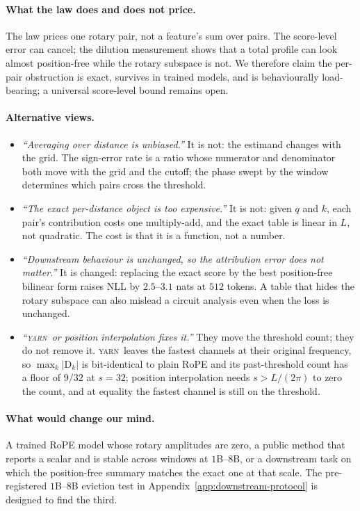 \documentclass{article}
\theoremstyle{plain}
\theoremstyle{remark}
\newcommand{\yarn}{\textsc{yarn}}
\newcommand{\D}{\mathrm{D}_k}
\begin{document}
\paragraph{What the law does and does not price.} The law prices one rotary
pair, not a feature's sum over pairs. The score-level error can cancel; the
dilution measurement shows that a total profile can look almost position-free
while the rotary subspace is not. We therefore claim the per-pair obstruction is
exact, survives in trained models, and is behaviourally load-bearing; a
universal score-level bound remains open.

\paragraph{Alternative views.}
\begin{itemize}
\item \emph{``Averaging over distance is unbiased.''} It is not: the estimand
changes with the grid. The sign-error rate is a ratio whose numerator and
denominator both move with the grid and the cutoff; the phase swept by the
window determines which pairs cross the threshold.
\item \emph{``The exact per-distance object is too expensive.''} It is not:
given $q$ and $k$, each pair's contribution costs one multiply-add, and the
exact table is linear in $L$, not quadratic. The cost is that it is a function,
not a number.
\item \emph{``Downstream behaviour is unchanged, so the attribution error does
not matter.''} It is changed: replacing the exact score by the best
position-free bilinear form raises NLL by $2.5$--$3.1$ nats at $512$ tokens.
A table that hides the rotary subspace can also mislead a circuit analysis even
when the loss is unchanged.
\item \emph{``\yarn\ or position interpolation fixes it.''} They move the
threshold count; they do not remove it. \yarn\ leaves the fastest channels at
their original frequency, so $\max_k|\D|$ is bit-identical to plain RoPE and
its past-threshold count has a floor of $9/32$ at $s=32$; position
interpolation needs $s>L/(2\pi)$ to zero the count, and at equality the fastest
channel is still on the threshold.
\end{itemize}

\paragraph{What would change our mind.} A trained RoPE model whose rotary
amplitudes are zero, a public method that reports a scalar and is stable across
windows at $1$B--$8$B, or a downstream task on which the position-free summary
matches the exact one at that scale. The pre-registered $1$B--$8$B eviction test
in Appendix~\ref{app:downstream-protocol} is designed to find the third.
\end{document}

